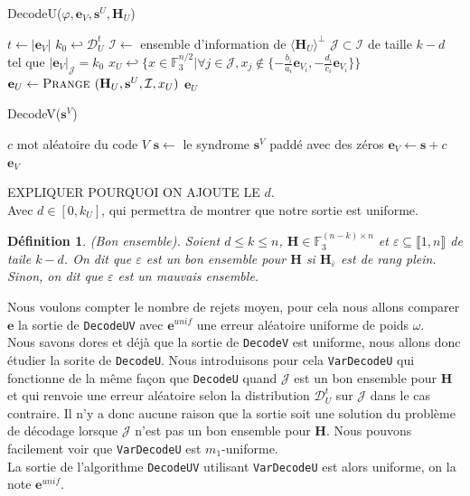 \documentclass[12pt]{article}
\theoremstyle{plain}
\newtheorem{defi}[thm]{Définition}
\newcommand{\F}{\mathbb{F}}
\newcommand{\e}{\mathbf{e}}
\newcommand{\s}{\mathbf{s}}
\newcommand{\J}{\mathcal{J}}
\newcommand{\D}{\mathcal{D}}
\begin{document}
\begin{algorithm}
	\caption{DecodeU($\varphi, \e_V, \s^U, \mathbf{H}_U$)}
	\begin{algorithmic}[1]
		\STATE $t \leftarrow |\e_V|$
		\STATE $k_0 \hookleftarrow \mathcal{D}_U^t$
		\REPEAT
		\STATE $\mathcal{I} \leftarrow$ ensemble d'information de $\langle\mathbf{H}_U\rangle^\perp$
		\STATE $\mathcal{J} \subset \mathcal{I}$ de taille $k-d$ tel que $|\e_V|_\mathcal{J} = k_0$
		\STATE $x_U \hookleftarrow \{x\in\F_3^{n/2} | \forall j\in\J,  x_j \notin \{-\frac{b_i}{a_i}\e_{V_i}, -\frac{d_i}{c_i}\e_{V_i}\}\}$
		\STATE $\e_U \leftarrow \textsc{Prange }(\mathbf{H}_U, \s^U, \mathcal{I}, x_U)$
		\UNTIL {$|\varphi(\e_U,\e_V)| \neq \omega$}
		\RETURN $\e_U$
    \end{algorithmic}
\end{algorithm}


\begin{algorithm}
	\caption{DecodeV($\s^V$)}
	\begin{algorithmic}[1]
    	\STATE $c$ mot aléatoire du code $V$
    	\STATE $\s \leftarrow$ le syndrome $\s^V$ paddé avec des zéros
    	\STATE $\e_V \leftarrow \s + c$
    	\RETURN $\e_V$
    \end{algorithmic}
\end{algorithm}

EXPLIQUER POURQUOI ON AJOUTE LE $d$.\\
Avec $d\in [0,k_U]$, qui permettra de montrer que notre sortie est uniforme.

\begin{defi} (Bon ensemble).
Soient $d \leq k \leq n$, $\mathbf{H}\in\F_3^{(n-k)\times n}$ et $\varepsilon \subseteq \llbracket1,n\rrbracket$ de taile $k-d$. On dit que $\varepsilon$ est un bon ensemble pour $\mathbf{H}$ si $\mathbf{H}_{\overline{\varepsilon}}$ est de rang plein. Sinon, on dit que $\varepsilon$ est un mauvais ensemble.
\end{defi}


\noindent Nous voulons compter le nombre de rejets moyen, pour cela nous allons comparer $\e$ la sortie de \verb|DecodeUV| avec $\e^{unif}$ une erreur aléatoire uniforme de poids $\omega$.\\
Nous savons dores et déjà que la sortie de \verb|DecodeV| est uniforme, nous allons donc étudier la sorite de \verb|DecodeU|.
Nous introduisons pour cela \verb|VarDecodeU| qui fonctionne de la même façon que \verb|DecodeU| quand $\J$ est un bon ensemble pour $\mathbf{H}$ et qui renvoie une erreur aléatoire selon la distribution $\D_U^t$ sur $\J$ dans le cas contraire.
Il n'y a donc aucune raison que la sortie soit une solution du problème de décodage lorsque $\J$ n'est pas un bon ensemble pour $\mathbf{H}$.
Nous pouvons facilement voir que \verb|VarDecodeU| est $m_1$-uniforme.\\
La sortie de l'algorithme \verb|DecodeUV| utilisant \verb|VarDecodeU| est alors uniforme, on la note $\e^{unif}$.\\
\end{document}
